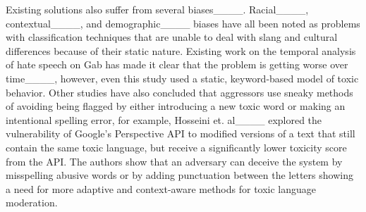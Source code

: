 Existing solutions also suffer from several biases____.
Racial____, contextual____, and demographic____ biases have all been noted as problems with classification techniques that are unable to deal with slang and cultural differences because of their static nature.
Existing work on the temporal analysis of hate speech on Gab has made it clear that the problem is getting worse over time____, however, even this study used a static, keyword-based model of toxic behavior.
Other studies have also concluded that aggressors use sneaky methods of avoiding being flagged by either introducing a new toxic word or making an intentional spelling error, for example, Hosseini et. al____ explored the vulnerability of Google's Perspective API to modified versions of a text that still contain the same toxic language, but receive a significantly lower toxicity score from the API.
The authors show that an adversary can deceive the system by misspelling abusive words or by adding punctuation between the letters showing a need for more adaptive and context-aware methods for toxic language moderation.


